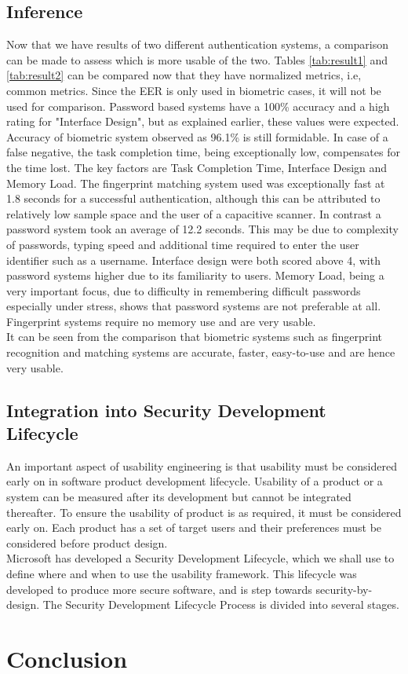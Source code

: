 \subsection{Inference}
Now that we have results of two different authentication systems, a comparison can be made to assess which is more usable of the two. Tables \ref{tab:result1} and \ref{tab:result2} can be compared now that they have normalized metrics, i.e, common metrics. Since the EER is only used in biometric cases, it will not be used for comparison. Password based systems have a 100\% accuracy and a high rating for "Interface Design", but as explained earlier, these values were expected. Accuracy of biometric system observed as 96.1\% is still formidable. In case of a false negative, the task completion time, being exceptionally low, compensates for the time lost. The key factors are Task Completion Time, Interface Design and Memory Load. The fingerprint matching system used was exceptionally fast at 1.8 seconds for a successful authentication, although this can be attributed to relatively low sample space and the user of a capacitive scanner. In contrast a password system took an average of 12.2 seconds. This may be due to complexity of passwords, typing speed and additional time required to enter the user identifier such as a username. Interface design were both scored above 4, with password systems higher due to its familiarity to users. Memory Load, being a very important focus, due to difficulty in remembering difficult passwords especially under stress, shows that password systems are not preferable at all. Fingerprint systems require no memory use and are very usable.\\
It can be seen from the comparison that biometric systems such as fingerprint recognition and matching systems are accurate, faster, easy-to-use and are hence very usable. 

\subsection{Integration into Security Development Lifecycle}
An important aspect of usability engineering is that usability must be considered early on in software product development lifecycle. Usability of a product or a system can be measured after its development but cannot be integrated thereafter. To ensure the usability of product is as required, it must be considered early on. Each product has a set of target users and their preferences must be considered before product design. \\
Microsoft has developed a Security Development Lifecycle\cite{howard2006security}, which we shall use to define where and when to use the usability framework. This lifecycle was developed to produce more secure software, and is step towards security-by-design. The Security Development Lifecycle Process is divided into several stages. 

\section{Conclusion}


